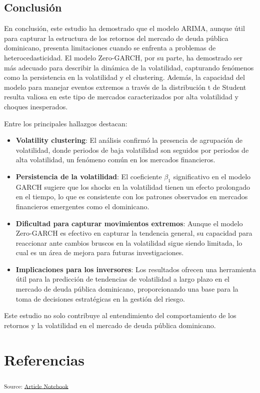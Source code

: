 \documentclass[
  number,
  preprint,
  3p,
  onecolumn]{elsarticle}
\begin{document}
\subsection{Conclusión}\label{conclusiuxf3n}

En conclusión, este estudio ha demostrado que el modelo ARIMA, aunque
útil para capturar la estructura de los retornos del mercado de deuda
pública dominicano, presenta limitaciones cuando se enfrenta a problemas
de heterocedasticidad. El modelo Zero-GARCH, por su parte, ha demostrado
ser más adecuado para describir la dinámica de la volatilidad,
capturando fenómenos como la persistencia en la volatilidad y el
clustering. Además, la capacidad del modelo para manejar eventos
extremos a través de la distribución t de Student resulta valiosa en
este tipo de mercados caracterizados por alta volatilidad y choques
inesperados.

Entre los principales hallazgos destacan:

\begin{itemize}
\item
  \textbf{Volatility clustering}: El análisis confirmó la presencia de
  agrupación de volatilidad, donde periodos de baja volatilidad son
  seguidos por periodos de alta volatilidad, un fenómeno común en los
  mercados financieros.
\item
  \textbf{Persistencia de la volatilidad}: El coeficiente \(\beta_1\)
  significativo en el modelo GARCH sugiere que los shocks en la
  volatilidad tienen un efecto prolongado en el tiempo, lo que es
  consistente con los patrones observados en mercados financieros
  emergentes como el dominicano.
\item
  \textbf{Dificultad para capturar movimientos extremos}: Aunque el
  modelo Zero-GARCH es efectivo en capturar la tendencia general, su
  capacidad para reaccionar ante cambios bruscos en la volatilidad sigue
  siendo limitada, lo cual es un área de mejora para futuras
  investigaciones.
\item
  \textbf{Implicaciones para los inversores}: Los resultados ofrecen una
  herramienta útil para la predicción de tendencias de volatilidad a
  largo plazo en el mercado de deuda pública dominicano, proporcionando
  una base para la toma de decisiones estratégicas en la gestión del
  riesgo.
\end{itemize}

Este estudio no solo contribuye al entendimiento del comportamiento de
los retornos y la volatilidad en el mercado de deuda pública dominicano.

\section{Referencias}\label{referencias}

\textsubscript{Source:
\href{https://iancont.github.io/fixed_income_garch/index.qmd.html}{Article
Notebook}}


  
\end{document}
